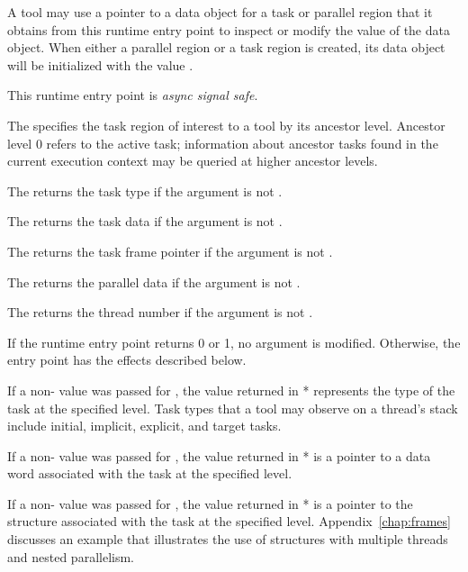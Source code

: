 A tool may use a pointer to a data object for a task or parallel
region that it obtains from this runtime entry point to inspect or modify the
value of the data object.  When either a parallel region or a task
region is created, its data object will be initialized with the value
.

This runtime entry point is \emph{async signal safe}.

\argdesc

The \callbackarg{}  specifies the task region
of interest to a tool by its ancestor level.  Ancestor level 0 refers
to the active task; information about
ancestor tasks found in the current execution context may be queried at
higher ancestor levels.

The \callbackarg{}  returns the task type 
if the argument is not .

The \callbackarg{}  returns the task data
if the argument is not .

The \callbackarg{}  returns the task frame
pointer 
if the argument is not .

The \callbackarg{}  returns the parallel data
if the argument is not .

The \callbackarg{}  returns the thread number
if the argument is not .

\effect


If the runtime entry point returns 0 or 1, no argument is modified.
Otherwise, the entry point has the effects described below.

If a non- value was passed for ,
the value returned in * represents the type of the task
at the specified level.
Task types that a tool may observe on a thread's stack include
initial, implicit, explicit, and target tasks.

If a non- value was passed for ,
the value returned in * is a pointer to a data word
associated with the task at the specified level.

If a non- value was passed for ,
the value returned in * is a pointer to the
 structure associated with the task at the specified level.
Appendix~\ref{chap:frames} discusses an example that
illustrates the use of  structures with multiple
threads and nested parallelism.

